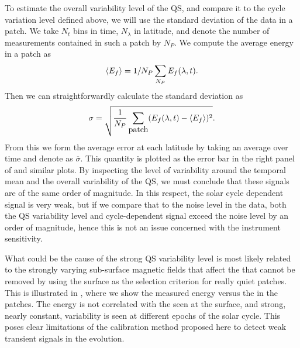 \documentclass{aa}
\begin{document}
To estimate 
the overall variability level of the QS, and compare it to the cycle variation level defined above,
we will use the standard deviation of the data in a patch.
We take $N_t$ bins in time, $N_\lambda$ in latitude, and denote the number of \ef measurements contained in such a patch by $N_P$. We compute the average \fff energy in a patch as
\begin{equation}
\langle E_f \rangle=1/N_P \sum_{N_P} E_f (\lambda,t).
\end{equation}
Then we can straightforwardly calculate the standard deviation as
\begin{equation}
\sigma= \sqrt{\frac{1}{N_P}\sum_{\mbox{patch}} ( E_f(\lambda,t)
- \left<{E_f} \right>)^2}.
\end{equation}
From this we form the average error at each latitude by taking an average over time and denote as $\overline{\sigma}$. 
This quantity is plotted as the error bar in the right panel of  and similar plots.
By inspecting the level of variability around the temporal mean and the 
overall variability of the QS, we must conclude that these signals are of the same order of magnitude. 
In this respect, the solar cycle dependent signal is very weak, but if we compare that to the noise level in the data, both the QS variability level and cycle-dependent signal exceed the noise level by an order of magnitude, hence this is not an issue concerned with the instrument sensitivity.

What could be the cause of the strong QS variability level is most likely related to the strongly varying sub-surface magnetic fields that affect the \fff that cannot be removed by using the surface \brms{} as the selection criterion for really quiet patches. This is illustrated in , where we show the measured \fff energy versus the \brms{} in the patches. The \fff energy is not correlated with the \brms{} seen at the surface, and strong, nearly constant, variability is seen at different epochs of the solar cycle. This poses clear limitations of the calibration method proposed here to detect weak transient signals in the \fff evolution.
\end{document}

